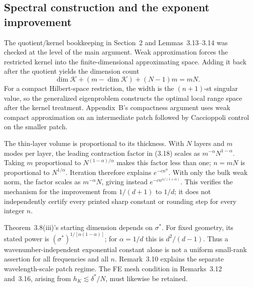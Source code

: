 \documentclass[10pt]{article}
\begin{document}
\subsection*{Spectral construction and the exponent improvement}
The quotient/kernel bookkeeping in Section 2 and Lemmas 3.13–3.14 was checked at the level of the main argument. Weak approximation forces the restricted kernel into the finite-dimensional approximating space. Adding it back after the quotient yields the dimension count \[\dim\mathcal K+(m-\dim\mathcal K)+(N-1)m=mN.\] For a compact Hilbert-space restriction, the width is the \((n+1)\)-st singular value, so the generalized eigenproblem constructs the optimal local range space after the kernel treatment. Appendix B’s compactness argument uses weak compact approximation on an intermediate patch followed by Caccioppoli control on the smaller patch.\par
The thin-layer volume is proportional to its thickness. With \(N\) layers and \(m\) modes per layer, the leading contraction factor in (3.18) scales as \(m^{-\alpha}N^{1-\alpha}\). Taking \(m\) proportional to \(N^{(1-\alpha)/\alpha}\) makes this factor less than one; \(n=mN\) is proportional to \(N^{1/\alpha}\). Iteration therefore explains \(e^{-c n^\alpha}\). With only the bulk weak norm, the factor scales as \(m^{-\alpha}N\), giving instead \(e^{-c n^{\alpha/(1+\alpha)}}\). This verifies the mechanism for the improvement from \(1/(d+1)\) to \(1/d\); it does not independently certify every printed sharp constant or rounding step for every integer \(n\).\par
Theorem 3.8(iii)’s starting dimension depends on \(\sigma^*\). For fixed geometry, its stated power is \((\sigma^*)^{1/[\alpha(1-\alpha)]}\); for \(\alpha=1/d\) this is \(d^2/(d-1)\). Thus a wavenumber-independent exponential constant alone is not a uniform small-rank assertion for all frequencies and all \(n\). Remark 3.10 explains the separate wavelength-scale patch regime. The FE mesh condition in Remarks 3.12 and 3.16, arising from \(h_K\lesssim\delta^*/N\), must likewise be retained.\par
\end{document}
